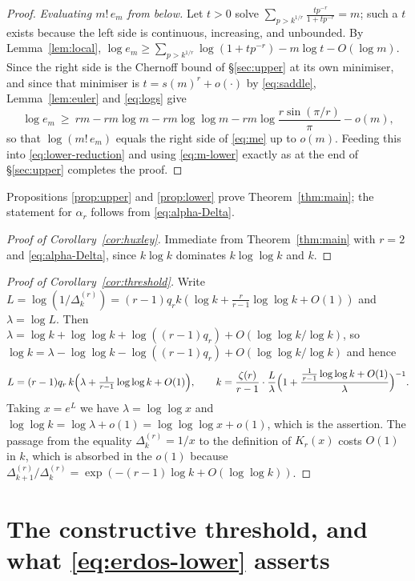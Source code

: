 \documentclass[11pt,reqno]{amsart}
\theoremstyle{plain}
\theoremstyle{definition}
\numberwithin{equation}{section}
\begin{document}
\begin{proof}
\emph{Evaluating $m!\,e_m$ from below.}
Let $t>0$ solve $\sum_{p>k^{1/r}}\frac{tp^{-r}}{1+tp^{-r}}=m$; such a $t$ exists because the
left side is continuous, increasing, and unbounded. By Lemma~\ref{lem:local},
$\log e_m\ge\sum_{p>k^{1/r}}\log(1+tp^{-r})-m\log t-O(\log m)$. Since the right side is the
Chernoff bound of \S\ref{sec:upper} at its own minimiser, and since that minimiser is
$t=s(m)^{r}+o(\cdot)$ by \eqref{eq:saddle}, Lemma~\ref{lem:euler} and \eqref{eq:logs} give
\[
  \log e_m\ \ge\ rm-rm\log m-rm\log\log m-rm\log\frac{r\sin(\pi/r)}{\pi}-o(m),
\]
so that $\log(m!\,e_m)$ equals the right side of \eqref{eq:me} up to $o(m)$. Feeding this
into \eqref{eq:lower-reduction} and using \eqref{eq:m-lower} exactly as at the end of
\S\ref{sec:upper} completes the proof.
\end{proof}

Propositions \ref{prop:upper} and \ref{prop:lower} prove Theorem~\ref{thm:main}; the
statement for $\alpha_r$ follows from \eqref{eq:alpha-Delta}.

\begin{proof}[Proof of Corollary~\ref{cor:huxley}]
Immediate from Theorem~\ref{thm:main} with $r=2$ and \eqref{eq:alpha-Delta}, since
$k\log k$ dominates $k\log\log k$ and $k$.
\end{proof}

\begin{proof}[Proof of Corollary~\ref{cor:threshold}]
Write $L=\log(1/\Delta^{(r)}_k)=(r-1)q_rk(\log k+\frac{r}{r-1}\log\log k+O(1))$ and
$\lambda=\log L$. Then $\lambda=\log k+\log\log k+\log((r-1)q_r)+O(\log\log k/\log k)$, so
$\log k=\lambda-\log\log k-\log((r-1)q_r)+O(\log\log k/\log k)$ and hence
\[
  L=(r-1)q_r\,k\Bigl(\lambda+\tfrac1{r-1}\log\log k+O(1)\Bigr),\qquad
  k=\frac{\zeta(r)}{r-1}\cdot\frac{L}{\lambda}
  \Bigl(1+\frac{\frac1{r-1}\log\log k+O(1)}{\lambda}\Bigr)^{-1}.
\]
Taking $x=e^{L}$ we have $\lambda=\log\log x$ and
$\log\log k=\log\lambda+o(1)=\log\log\log x+o(1)$, which is the assertion. The passage from
the equality $\Delta^{(r)}_k=1/x$ to the definition of $K_r(x)$ costs $O(1)$ in $k$, which
is absorbed in the $o(1)$ because
$\Delta^{(r)}_{k+1}/\Delta^{(r)}_k=\exp(-(r-1)\log k+O(\log\log k))$.
\end{proof}

\section{The constructive threshold, and what \eqref{eq:erdos-lower} asserts}
\label{sec:constructive}
\end{document}
